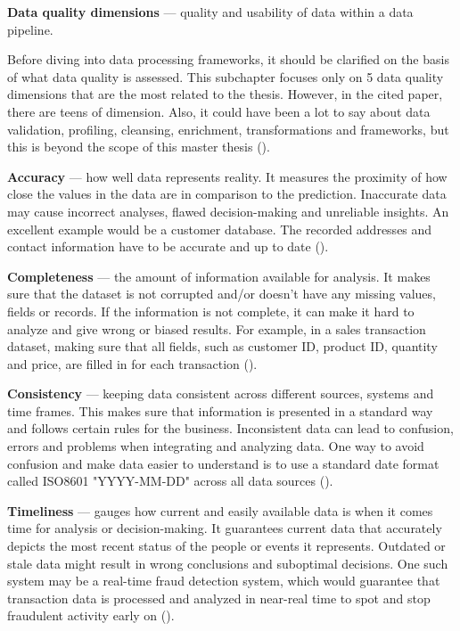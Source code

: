\textbf{Data quality dimensions} — quality and usability of data within a data pipeline.

Before diving into data processing frameworks, it should be clarified on the basis of what data quality is assessed. This subchapter focuses only on 5 data quality dimensions that are the most related to the thesis. However, in the cited paper, there are teens of dimension. Also, it could have been a lot to say about data validation, profiling, cleansing, enrichment, transformations and frameworks, but this is beyond the scope of this master thesis (\cite{andrewblackDimensionsDataQuality2020})\footnotemark[19].

\textbf{Accuracy} — how well data represents reality. It measures the proximity of how close the values in the data are in comparison to the prediction. Inaccurate data may cause incorrect analyses, flawed decision-making and unreliable insights. An excellent example would be a customer database. The recorded addresses and contact information have to be accurate and up to date (\cite{andrewblackDimensionsDataQuality2020})\footnotemark[19].

\textbf{Completeness} — the amount of information available for analysis. It makes sure that the dataset is not corrupted and/or doesn't have any missing values, fields or records. If the information is not complete, it can make it hard to analyze and give wrong or biased results. For example, in a sales transaction dataset, making sure that all fields, such as customer ID, product ID, quantity and price, are filled in for each transaction (\cite{andrewblackDimensionsDataQuality2020})\footnotemark[19].

\textbf{Consistency} — keeping data consistent across different sources, systems and time frames. This makes sure that information is presented in a standard way and follows certain rules for the business. Inconsistent data can lead to confusion, errors and problems when integrating and analyzing data. One way to avoid confusion and make data easier to understand is to use a standard date format called ISO8601 "YYYY-MM-DD" across all data sources (\cite{andrewblackDimensionsDataQuality2020})\footnotemark[19].

\textbf{Timeliness} — gauges how current and easily available data is when it comes time for analysis or decision-making. It guarantees current data that accurately depicts the most recent status of the people or events it represents. Outdated or stale data might result in wrong conclusions and suboptimal decisions. One such system may be a real-time fraud detection system, which would guarantee that transaction data is processed and analyzed in near-real time to spot and stop fraudulent activity early on (\cite{andrewblackDimensionsDataQuality2020})\footnotemark[19].

